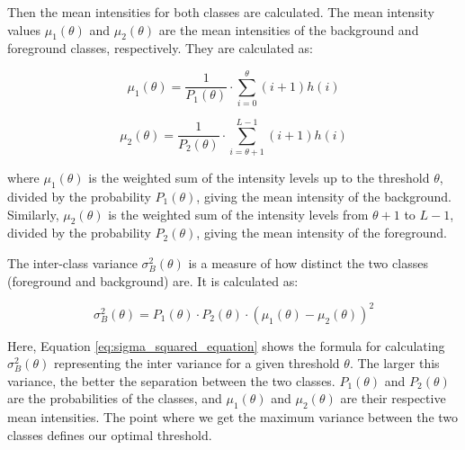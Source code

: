 \documentclass[%
	a4paper, %
	12pt, %
	english, %
	bibtotoc %
]{scrartcl}
\begin{document}
Then the mean intensities for both classes are calculated. The mean intensity values \( \mu_1(\theta) \) and \( \mu_2(\theta) \) are the mean intensities of the background and foreground classes, respectively. They are calculated as:

\begin{equation}
\mu_1(\theta) = \frac{1}{P_1(\theta)} \cdot \sum_{i=0}^{\theta} (i + 1) h(i)
\end{equation}

\begin{equation}
\mu_2(\theta) = \frac{1}{P_2(\theta)} \cdot \sum_{i=\theta+1}^{L-1} (i + 1) h(i)
\end{equation}

where \( \mu_1(\theta) \) is the weighted sum of the intensity levels up to the threshold \( \theta \), divided by the probability \( P_1(\theta) \), giving the mean intensity of the background. Similarly, \( \mu_2(\theta) \) is the weighted sum of the intensity levels from \( \theta+1 \) to \( L-1 \), divided by the probability \( P_2(\theta) \), giving the mean intensity of the foreground.

The inter-class variance \( \sigma_B^2(\theta) \) is a measure of how distinct the two classes (foreground and background) are. It is calculated as:

\begin{equation}
\sigma_B^2(\theta) = P_1(\theta) \cdot P_2(\theta) \cdot \left(\mu_1(\theta) - \mu_2(\theta)\right)^2
\label{eq:sigma_squared_equation}
\end{equation}

Here, Equation \ref{eq:sigma_squared_equation} shows the formula for calculating \( \sigma_B^2(\theta) \) representing the inter variance for a given threshold \( \theta \). The larger this variance, the better the separation between the two classes. \( P_1(\theta) \) and \( P_2(\theta) \) are the probabilities of the classes, and \( \mu_1(\theta) \) and \( \mu_2(\theta) \) are their respective mean intensities. The point where we get the maximum variance between the two classes defines our optimal threshold.
\end{document}
